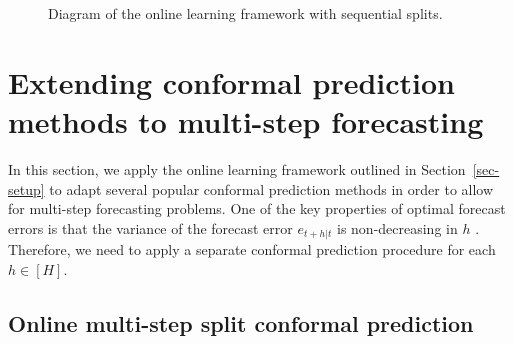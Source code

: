 \documentclass[
  11pt,
  a4paper,
]{article}
\theoremstyle{plain}
\theoremstyle{remark}
\begin{document}
\begin{figure}


\caption{\label{fig-flowchart}Diagram of the online learning framework
with sequential splits.}

\end{figure}%


\section{Extending conformal prediction methods to multi-step
forecasting}\label{sec-ext}

In this section, we apply the online learning framework outlined in
Section~\ref{sec-setup} to adapt several popular conformal prediction
methods in order to allow for multi-step forecasting problems. One of
the key properties of optimal forecast errors is that the variance of
the forecast error \(e_{t+h|t}\) is non-decreasing in \(h\)
\autocite{diebold1996,patton2007}. Therefore, we need to apply a
separate conformal prediction procedure for each \(h \in [H]\).


\subsection{Online multi-step split conformal
prediction}\label{online-multi-step-split-conformal-prediction}
\end{document}

